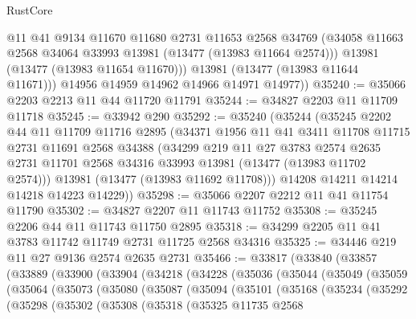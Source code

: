 \begin{lexlean}{RustCore}
\begin{coremodule}
            @11
            @41
            @9134
            @11670
            @11680
            @2731
            @11653
            @2568
            @34769
            (@34058 @11663 @2568 @34064 @33993 @13981 (@13477 (@13983 @11664 @2574)))
            @13981
            (@13477 (@13983 @11654 @11670)))
          @13981
          (@13477 (@13983 @11644 @11671)))
        @14956
        @14959
        @14962
        @14966
        @14971
        @14977))
@35240 := @35066 @2203 @2213 @11 @44 @11720 @11791
@35244 := @34827 @2203 @11 @11709 @11718
@35245 := @33942 @290
@35292 := @35240
    (@35244
      (@35245
        @2202
        @44
        @11
        @11709
        @11716
        @2895
        (@34371
          @1956
          @11
          @41
          @3411
          @11708
          @11715
          @2731
          @11691
          @2568
          @34388
          (@34299
            @219
            @11
            @27
            @3783
            @2574
            @2635
            @2731
            @11701
            @2568
            @34316
            @33993
            @13981
            (@13477 (@13983 @11702 @2574)))
          @13981
          (@13477 (@13983 @11692 @11708)))
        @14208
        @14211
        @14214
        @14218
        @14223
        @14229))
@35298 := @35066 @2207 @2212 @11 @41 @11754 @11790
@35302 := @34827 @2207 @11 @11743 @11752
@35308 := @35245 @2206 @44 @11 @11743 @11750 @2895
@35318 := @34299 @2205 @11 @41 @3783 @11742 @11749 @2731 @11725 @2568 @34316
@35325 := @34446 @219 @11 @27 @9136 @2574 @2635 @2731
@35466 := @33817
    (@33840
      (@33857
        (@33889
          (@33900
            (@33904
              (@34218
                (@34228
                  (@35036
                    (@35044
                      (@35049
                        (@35059
                          (@35064
                            (@35073
                              (@35080
                                (@35087
                                  (@35094
                                    (@35101
                                      (@35168
                                        (@35234
                                          (@35292
                                            (@35298
                                              (@35302
                                                (@35308
                                                  (@35318
                                                    (@35325
                                                      @11735
                                                      @2568

\end{coremodule}
\end{lexlean}
